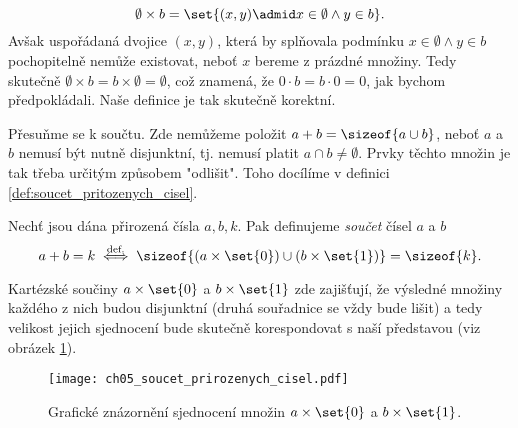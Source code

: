 \begin{equation*}
    \emptyset\times b=\set{(x,y) \admid x\in\emptyset \land y\in b}.
\end{equation*}
Avšak uspořádaná dvojice $(x,y)$, která by splňovala podmínku $x\in\emptyset \land y\in b$ pochopitelně nemůže existovat, neboť $x$ bereme z prázdné množiny. Tedy skutečně $\emptyset\times b=b\times\emptyset=\emptyset$, což znamená, že $0\cdot b=b\cdot 0=0$, jak bychom předpokládali. Naše definice je tak skutečně korektní.\par
Přesuňme se k součtu. Zde nemůžeme položit $a+b=\sizeof{a\cup b}$, neboť $a$ a $b$ nemusí být nutně disjunktní, tj. nemusí platit $a\cap b\neq\emptyset$. Prvky těchto množin je tak třeba určitým způsobem "odlišit". Toho docílíme v definici \ref{def:soucet_pritozenych_cisel}.
\begin{definition}\label{def:soucet_pritozenych_cisel}
    Nechť jsou dána přirozená čísla $a,b,k$. Pak definujeme \emph{součet} čísel $a$ a $b$
    \begin{equation*}
        a+b=k\stackrel{\text{def.}}{\iff} \sizeof{(a\times\set{0})\cup (b\times\set{1})}=\sizeof{k}.
    \end{equation*}
\end{definition}
Kartézské součiny $a\times\set{0}$ a $b\times\set{1}$ zde zajišťují, že výsledné množiny každého z nich budou disjunktní (druhá souřadnice se vždy bude lišit) a tedy velikost jejich sjednocení bude skutečně korespondovat s naší představou (viz obrázek \ref{fig:soucet_prirozenych_cisel}).
\begin{figure}[H]
	\centering
	\texttt{[image: ch05\_soucet\_prirozenych\_cisel.pdf]}
    \caption{Grafické znázornění sjednocení množin $a\times\set{0}$ a $b\times\set{1}$.}
    \label{fig:soucet_prirozenych_cisel}
\end{figure}